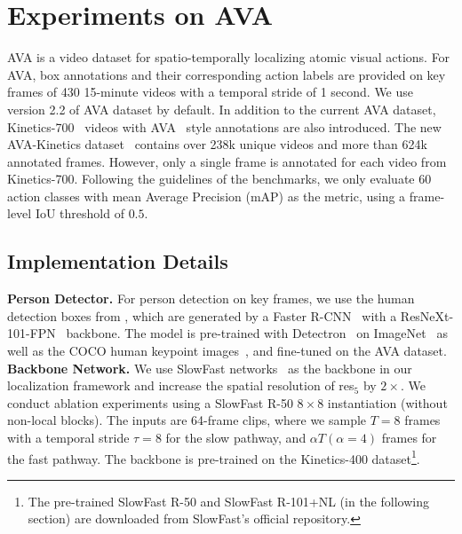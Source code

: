 \section{Experiments on AVA}
\label{sec:Experiments}

AVA \cite{gu2018ava} is a video dataset for spatio-temporally localizing atomic visual actions. For AVA, box annotations and their corresponding action labels are provided on key frames of 430 15-minute videos with a temporal stride of 1 second. We use version 2.2 of AVA dataset by default.
In addition to the current AVA dataset, Kinetics-700~\cite{carreira2019short} videos with AVA~\cite{gu2018ava} style annotations are also introduced. The new AVA-Kinetics dataset~\cite{li2020ava} contains over 238k unique videos and more than 624k annotated frames. However, only a single frame is annotated for each video from Kinetics-700.
Following the guidelines of the benchmarks, we only evaluate 60 action classes with mean Average Precision (mAP) as the metric, using a frame-level IoU threshold of $0.5$. 






\subsection{Implementation Details}


{\flushleft \bf Person Detector.} For person detection on key frames, we use the human detection boxes from \cite{wu2019long}, which are generated by a Faster R-CNN~\cite{ren2015faster} with a ResNeXt-101-FPN~\cite{xie2017aggregated,lin2017feature} backbone. The model is pre-trained with Detectron~\cite{girshick2018detectron} on ImageNet~\cite{deng2009imagenet} as well as the COCO human keypoint images~\cite{lin2014microsoft}, and fine-tuned on the AVA dataset.
\vspace{-2mm}
{\flushleft \bf Backbone Network.} We use SlowFast networks~\cite{feichtenhofer2019slowfast} as the backbone in our localization framework and increase the spatial resolution of res$_5$ by $2\times$. We conduct ablation experiments using a SlowFast R-50 $8\times8$ instantiation (without non-local blocks). The inputs are 64-frame clips, where we sample $T=8$ frames with a temporal stride $\tau=8$ for the slow pathway, and $\alpha T (\alpha=4)$ frames for the fast pathway.  The backbone is pre-trained on the Kinetics-400 dataset\footnote{The pre-trained SlowFast R-50 and SlowFast R-101+NL (in the following section) are downloaded from SlowFast's official repository.
}.


